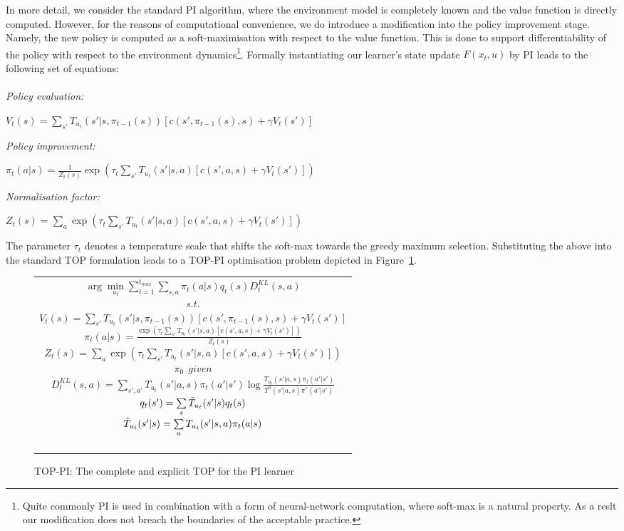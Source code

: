 In more detail, we consider the standard PI algorithm, where the
environment model is completely known and the value function is
directly computed. However, for the reasons of computational
convenience, we do introduce a modification into the policy
improvement stage. Namely, the new policy is computed as a
soft-maximisation with respect to the value function. This is done to
support differentiability of the policy with respect to the
environment dynamics\footnote{Quite commonly PI is used in combination
  with a form of neural-network computation, where soft-max is a
  natural property. As a reslt our modification does not breach the
  boundaries of the acceptable practice.}.
Formally instantiating our learner's state update $F(x_t,u)$ by PI
leads to the following set of equations:\\\ \\
{\em Policy evaluation:}\\
\centerline{
  $V_t(s)=\sum\limits_{s'}T_{u_t}(s'|s,\pi_{t-1}(s))\left[
    c(s',\pi_{t-1}(s),s)+\gamma V_t(s')
    \right]$}
{\em Policy improvement:}\\
\centerline{
$\pi_t(a|s)=\frac{1}{Z_t(s)}\exp\left(\tau_t\sum\limits_{s'}T_{u_t}(s'|s,a)\left[
    c(s',a,s)+\gamma V_t(s')
    \right]\right)$}
{\em Normalisation factor:}\\ 
\centerline{
$Z_t(s)=\sum\limits_a\exp\left(\tau_t\sum\limits_{s'}T_{u_t}(s'|s,a)\left[
    c(s',a,s)+\gamma V_t(s') \right]\right)$}

The parameter
$\tau_t$ denotes a temperature scale that shifts the soft-max towards
the greedy maximum selection. Substituting the above into the standard
TOP formulation leads to a TOP-PI optimisation problem depicted in
Figure~\ref{t_opt_PI}.
\begin{figure}[th]
\begin{tabular}{|c|} \hline \parbox{3.2 in} {\center 
$\arg\min\limits_{u_t}\sum\limits_{t=1}^{t_{max}}\sum\limits_{s,a}\pi_t(a|s)q_t(s)D^{KL}_t(s,a)$\\
$s.t.$\\
$V_t(s)=\sum\limits_{s'}T_{u_t}(s'|s,\pi_{t-1}(s))\left[
c(s',\pi_{t-1}(s),s)+\gamma V_t(s')
\right]$\\
$\pi_t(a|s)=\frac{\exp\left(\tau_t\sum\limits_{s'}T_{u_t}(s'|s,a)\left[
c(s',a,s)+\gamma V_t(s')
\right]\right)}{Z_t(s)}$\\
$Z_t(s)=\sum\limits_a\exp\left(\tau_t\sum\limits_{s'}T_{u_t}(s'|s,a)\left[
c(s',a,s)+\gamma V_t(s')
\right]\right)$\\
$\pi_0\ \ \displaystyle{given}$\\
$D^{KL}_t(s,a)=\sum\limits_{s',a'}T_{u_t}(s'|a,s)\pi_t(a'|s')\log\frac{T_{u_t}(s'|a,s)\pi_t(a'|s')}{T^0(s'|a,s)\pi^*(a'|s')}$\\
$q_t(s')=\sum\limits_s\Tilde{T}_{u_t}(s'|s)q_t(s)$\\
$\Tilde{T}_{u_t}(s'|s)=\sum\limits_aT_{u_t}(s'|s,a)\pi_t(a|s)$\\\ \\
}\\ \hline \end{tabular}
\caption{\label{t_opt_PI}TOP-PI: The complete and explicit TOP for the
  PI learner}
\end{figure}
